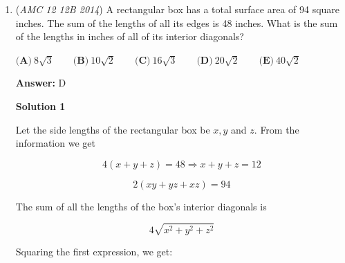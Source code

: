 \begin{enumerate}
 
$b\geq{\frac{3+{\sqrt{5}}}{2}}$ is a necessary condition. We have found a lower bound for $b$. Now we need to prove that $b={\frac{3+{\sqrt{5}}}{2}}$ can satisfy the conditions.

 
A value of $a$ that is just adequate to make a triangle degenerate might be useful. We choose $a=b-1={\frac{1+{\sqrt{5}}}{2}}$.

 
We have $1+\frac{1+{\sqrt{5}}}{2}=\frac{3+{\sqrt{5}}}{2}$, which means that there is not a triangle with positive area with these side lengths.

 We also have $1\div\frac{3+{\sqrt{5}}}{2}+1\div\frac{1+{\sqrt{5}}}{2}$
$=\frac{2}{3+{\sqrt{5}}}+\frac{2}{1+{\sqrt{5}}}$
$=\frac{2({\sqrt{5}}-3)}{({\sqrt{5}}+3)({\sqrt{5}}-3)}+\frac{2({\sqrt{5}}-1)}{({\sqrt{5}}+1)({\sqrt{5}}-1)}$
$=\frac{2({\sqrt{5}}-3)}{-4}+\frac{2({\sqrt{5}}-1)}{4}$
$=\frac{3-\sqrt{5}}{2}+\frac{{\sqrt{5}}-1}{2}$
$=1$, which means that there is not a triangle with positive area with these side lengths.

 
We have shown that $b$ has a lower bound of ${\frac{3+{\sqrt{5}}}{2}}$, and for $b={\frac{3+{\sqrt{5}}}{2}}$, there exists a value of $a$ that satisfies the conditions. This completes the proof.

 
The smallest possible value of $b$ is ${\frac{3+{\sqrt{5}}}{2}}$.

 


	\item (\textit{AMC 12 12B 2014}) A rectangular box has a total surface area of 94 square inches. The sum of the lengths of all its edges is 48 inches. What is the sum of the lengths in inches of all of its interior diagonals?


 $\textbf{(A)}\ 8\sqrt{3}\qquad\textbf{(B)}\ 10\sqrt{2}\qquad\textbf{(C)}\ 16\sqrt{3}\qquad\textbf{(D)}\ 20\sqrt{2}\qquad\textbf{(E)}\ 40\sqrt{2}$

 \textbf{Answer: }D



\textbf{Solution 1}

Let the side lengths of the rectangular box be $x, y$  and $z$. From the information we get 

 
 \[4(x+y+z) = 48 \Rightarrow x+y+z = 12\]

 \[2(xy+yz+xz) = 94\]

 The sum of all the  lengths of the box's interior diagonals is 

 
 \[4 \sqrt{x^2+y^2+z^2}\]

 Squaring the first expression, we get: 


\end{enumerate}
